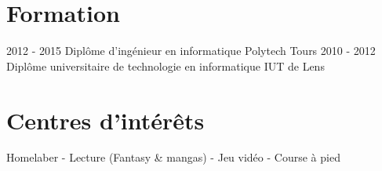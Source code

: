 \documentclass[]{friggeri-cv}
\begin{document}
\vspace{6pt}

\section{Formation}
\vspace{-5pt}
\begin{entrylist}
  \vspace{-8pt}
  \entry
    {2012 - 2015}
    {Diplôme d'ingénieur en informatique}
    {Polytech Tours}
    {}
  \entry
    {2010 - 2012}
    {Diplôme universitaire de technologie en informatique}
    {IUT de Lens}
    {}
\end{entrylist}

\section{Centres d'intérêts}
\vspace{-5pt}
\begin{entrylist}
  \entry
    {Homelaber - Lecture (Fantasy \& mangas) - Jeu vidéo - Course à pied}
    {}    {}    {}
\end{entrylist}
\end{document}
